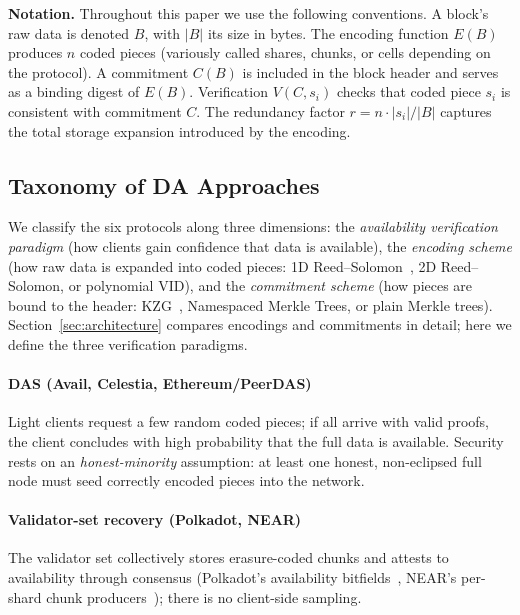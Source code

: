 \noindent\textbf{Notation.}
Throughout this paper we use the following conventions.
A block's raw data is denoted $B$, with $|B|$ its size in bytes.
The encoding function $E(B)$ produces $n$ coded pieces (variously called shares, chunks, or cells depending on the protocol).
A commitment $C(B)$ is included in the block header and serves as a binding digest of $E(B)$.
Verification $V(C, s_i)$ checks that coded piece $s_i$ is consistent with commitment $C$.
The redundancy factor $r = n \cdot |s_i| / |B|$ captures the total storage expansion introduced by the encoding.


\subsection{Taxonomy of DA Approaches}
\label{subsec:taxonomy}

We classify the six protocols along three dimensions: the \emph{availability verification paradigm} (how clients gain confidence that data is available), the \emph{encoding scheme} (how raw data is expanded into coded pieces: 1D Reed--Solomon~\cite{Reed1960RS}, 2D Reed--Solomon, or polynomial VID), and the \emph{commitment scheme} (how pieces are bound to the header: KZG~\cite{KZG_Original}, Namespaced Merkle Trees, or plain Merkle trees).
Section~\ref{sec:architecture} compares encodings and commitments in detail; here we define the three verification paradigms.

\paragraph{DAS (Avail, Celestia, Ethereum/PeerDAS)}
Light clients request a few random coded pieces; if all arrive with valid proofs, the client concludes with high probability that the full data is available.
Security rests on an \emph{honest-minority} assumption: at least one honest, non-eclipsed full node must seed correctly encoded pieces into the network.

\paragraph{Validator-set recovery (Polkadot, NEAR)}
The validator set collectively stores erasure-coded chunks and attests to availability through consensus (Polkadot's availability bitfields~\cite{Jeff_Burdges_ELVES}, NEAR's per-shard chunk producers~\cite{NEAR_Nightshade_Scaling_Blockchain}); there is no client-side sampling.

